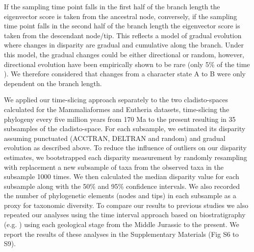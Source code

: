 \documentclass[12pt,letterpaper]{article}
\begin{document}
\begin{enumerate}
    If the sampling time point falls in the first half of the branch length the eigenvector score is taken from the ancestral node, conversely, if the sampling time point falls in the second half of the branch length the eigenvector score is taken from the descendant node/tip.
    This reflects a model of gradual evolution where changes in disparity are gradual and cumulative along the branch.
    Under this model, the gradual changes could be either directional or random, however, directional evolution have been empirically shown to be rare (only 5\% of the time \cite{Hunt21042015}).
    We therefore considered that changes from a character state A to B were only dependent on the branch length.
\end{enumerate}
We applied our time-slicing approach separately to the two cladisto-spaces calculated for the Mammaliaformes and Eutheria datasets, time-slicing the phylogeny every five million years from 170 Ma to the present resulting in 35 subsamples of the cladisto-space.
For each subsample, we estimated its disparity assuming punctuated (ACCTRAN, DELTRAN and random) and gradual evolution as described above.
To reduce the influence of outliers on our disparity estimates, we bootstrapped each disparity measurement by randomly resampling with replacement a new subsample of taxa from the observed taxa in the subsample 1000 times.
We then calculated the median disparity value for each subsample along with the 50\% and 95\% confidence intervals.
We also recorded the number of phylogenetic elements (nodes and tips) in each subsample as a proxy for taxonomic diversity.
To compare our results to previous studies we also repeated our analyses using the time interval approach based on biostratigraphy (e.g. \cite{Brusatte12092008}) using each geological stage from the Middle Jurassic to the present.
We report the results of these analyses in the Supplementary Materials (Fig S6 to S9).

\end{document}
